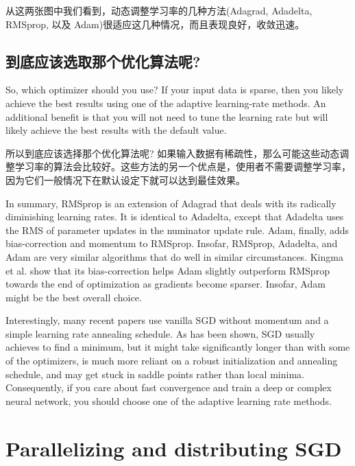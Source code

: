 \documentclass{article}
\begin{document}
从这两张图中我们看到，动态调整学习率的几种方法(Adagrad, Adadelta, RMSprop, 以及 Adam)很适应这几种情况，而且表现良好，收敛迅速。

\subsection{到底应该选取那个优化算法呢?}

So, which optimizer should you use? If your input data is sparse, then you likely achieve the best results using one of the adaptive learning-rate methods. An additional benefit is that you will not need to tune the learning rate but will likely achieve the best results with the default value.

所以到底应该选择那个优化算法呢? 如果输入数据有稀疏性，那么可能这些动态调整学习率的算法会比较好。这些方法的另一个优点是，使用者不需要调整学习率，因为它们一般情况下在默认设定下就可以达到最佳效果。

In summary, RMSprop is an extension of Adagrad that deals with its radically diminishing learning rates. It is identical to Adadelta, except that Adadelta uses the RMS of parameter updates in the numinator update rule. Adam, finally, adds bias-correction and momentum to RMSprop. Insofar, RMSprop, Adadelta, and Adam are very similar algorithms that do well in similar circumstances. Kingma et al. \cite{Kingma2015} show that its bias-correction helps Adam slightly outperform RMSprop towards the end of optimization as gradients become sparser. Insofar, Adam might be the best overall choice.

Interestingly, many recent papers use vanilla SGD without momentum and a simple learning rate annealing schedule. As has been shown, SGD usually achieves to find a minimum, but it might take significantly longer than with some of the optimizers, is much more reliant on a robust initialization and annealing schedule, and may get stuck in saddle points rather than local minima. Consequently, if you care about fast convergence and train a deep or complex neural network, you should choose one of the adaptive learning rate methods.

\section{Parallelizing and distributing SGD} \label{sec:parallelizing}
\end{document}
